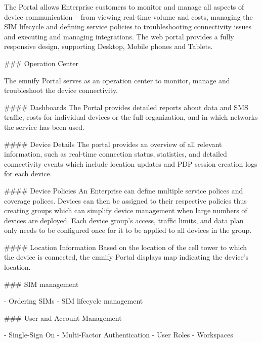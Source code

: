 \documentclass[11pt, oneside]{article}   	%
\newcommand{\addspace}{\vspace{2mm}}
\begin{document}
\begin{markdown}
The Portal allows Enterprise customers to monitor and manage all aspects of device communication -- from viewing real-time volume and costs, managing the SIM lifecycle and defining service policies to troubleshooting connectivity issues and executing and managing integrations. 
The web portal provides a fully responsive design, supporting Desktop, Mobile phones and Tablets.

### Operation Center

The emnify Portal serves as an operation center to monitor, manage and troubleshoot the device connectivity.

#### Dashboards
The Portal provides detailed reports about data and SMS traffic, costs for individual devices or the full organization, and in which networks the service has been used.

#### Device Details 
The portal provides an overview of all relevant information, such as real-time connection status, statistics, and detailed connectivity events which include location updates and PDP session creation logs for each device.

#### Device Policies
An Enterprise can define multiple service polices and coverage polices.
Devices can then be assigned to their respective policies thus creating groups which can simplify device management when large numbers of devices are deployed.
Each device group's access, traffic limits, and data plan only needs to be configured once for it to be applied to all devices in the group.

#### Location Information
Based on the location of the cell tower to which the device is connected, the emnify Portal displays map indicating the device's location.

### SIM management
\end{markdown}
\addspace
\begin{markdown}
- Ordering SIMs
- SIM lifecycle management
\end{markdown}
\addspace
\begin{markdown}
### User and Account Management
\end{markdown}
\addspace
\begin{markdown}
- Single-Sign On
- Multi-Factor Authentication
- User Roles
- Workspaces
\end{markdown}
\addspace
\end{document}
